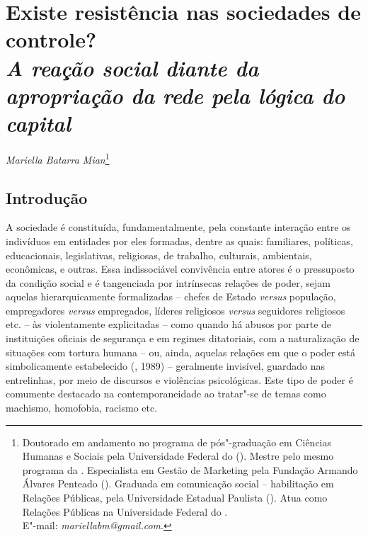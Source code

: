 \chapter*{Existe resistência nas sociedades de controle?\\ \emph{\small{A reação social diante da apropriação da rede pela lógica do capital}}}


\begin{flushright}
\emph{Mariella Batarra Mian}\footnote{Doutorado em andamento no programa de
  pós"-graduação em Ciências Humanas e Sociais pela Universidade Federal
  do  (). Mestre pelo mesmo programa da . Especialista em
  Gestão de Marketing pela Fundação Armando Álvares Penteado ().
  Graduada em comunicação social -- habilitação em Relações Públicas,
  pela Universidade Estadual Paulista (). Atua como Relações
  Públicas na Universidade Federal do .\\
  E"-mail: \emph{mariellabm@gmail.com}.}
\end{flushright}

\section{Introdução}

A sociedade é constituída, fundamentalmente, pela constante interação
entre os indivíduos em entidades por eles formadas, dentre as quais:
familiares, políticas, educacionais, legislativas, religiosas, de
trabalho, culturais, ambientais, econômicas, e outras. Essa
indissociável convivência entre atores é o pressuposto da condição
social e é tangenciada por intrínsecas relações de poder, sejam aquelas
hierarquicamente formalizadas -- chefes de Estado \emph{versus}
população, empregadores \emph{versus} empregados, líderes religiosos
\emph{versus} seguidores religiosos etc. -- às violentamente
explicitadas -- como quando há abusos por parte de instituições oficiais
de segurança e em regimes ditatoriais, com a naturalização de situações
com tortura humana -- ou, ainda, aquelas relações em que o poder está
simbolicamente estabelecido (, 1989) -- geralmente invisível,
guardado nas entrelinhas, por meio de discursos e violências
psicológicas. Este tipo de poder é comumente destacado na
contemporaneidade ao tratar"-se de temas como machismo, homofobia,
racismo etc.

